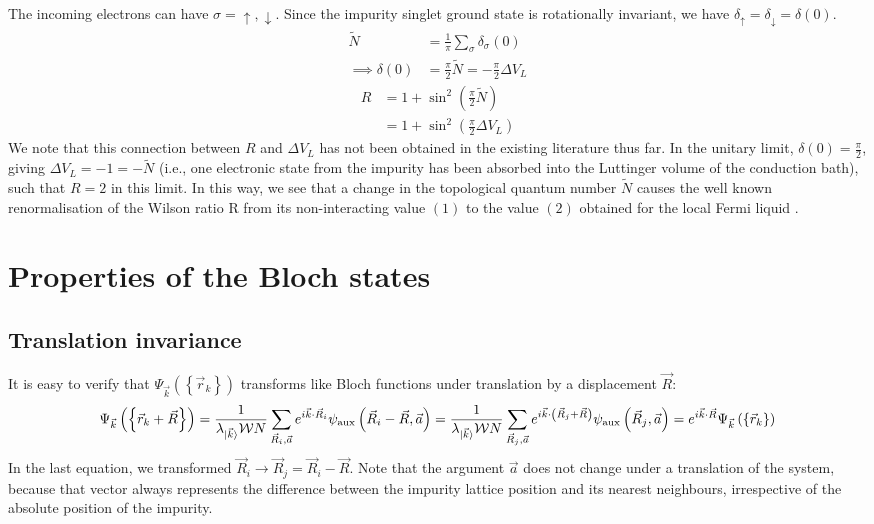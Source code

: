 \documentclass[prb]{revtex4-2}
\begin{document}
The incoming electrons can have \(\sigma = \uparrow,\downarrow\).
Since the impurity singlet ground state is rotationally invariant, we have \(\delta_\uparrow = \delta_\downarrow = \delta(0)\).
\begin{equation}\begin{aligned}
\widetilde N &= \frac{1}{\pi}\sum_\sigma\delta_\sigma(0)\\
\implies \delta(0) &= \frac{\pi}{2}\widetilde N = -\frac{\pi}{2}\Delta V_L
\end{aligned}\end{equation}
\begin{equation}\begin{aligned}
\label{wilson_luttinger}
R &= 1 + \sin^2 \left(\frac{\pi}{2}\widetilde N\right)\\
  &= 1 + \sin^2 \left(\frac{\pi}{2}\Delta V_L\right)
\end{aligned}\end{equation}
We note that this connection between \(R\) and \(\Delta V_L\) has not been obtained in the existing literature thus far. In the unitary limit, \(\delta(0) = \frac{\pi}{2}\), giving \(\Delta V_L = -1 = -\tilde N\) \cite{martin1982fermi} (i.e., one electronic state from the impurity has been absorbed into the Luttinger volume of the conduction bath), such that \(R = 2\) in this limit. In this way, we see that a change in the topological quantum number \(\tilde N\) causes the well known renormalisation of the Wilson ratio R from its non-interacting value \((1)\) to the value \((2)\) obtained for the local Fermi liquid \cite{nozieres1974fermi}.

\section{Properties of the Bloch states}

\subsection{Translation invariance}
It is easy to verify that \(\Psi_{\vec k}\left(\left\{ \vec r_k \right\}  \right) \) transforms like Bloch functions under translation by a displacement \(\vec R\):
\begin{equation}\begin{aligned}
	\Psi_{\vec k}\left(\left\{\vec r_k + \vec R\right\} \right) = \frac{1}{\lambda_{\ket{\vec k}} \mathcal{W} N}\sum_{\vec R_i,\vec a} e^{i \vec{k}\cdot\vec{R}_i} \psi_\text{aux}\left(\vec R_i - \vec R, \vec a\right) = \frac{1}{\lambda_{\ket{\vec k}} \mathcal{W} N}\sum_{\vec R_j, \vec a} e^{i \vec{k}\cdot\left(\vec{R}_j + \vec R\right)} \psi_\text{aux}\left(\vec R_j, \vec a\right) = e^{i \vec{k}\cdot\vec{R}} \Psi_{\vec k}\left(\left\{ \vec r_k \right\} \right)
\end{aligned}\end{equation}
In the last equation, we transformed \(\vec R_i \to \vec R_j = \vec R_i - \vec R\). Note that the argument \(\vec a\) does not change under a translation of the system, because that vector always represents the difference between the impurity lattice position and its nearest neighbours, irrespective of the absolute position of the impurity.
\end{document}
